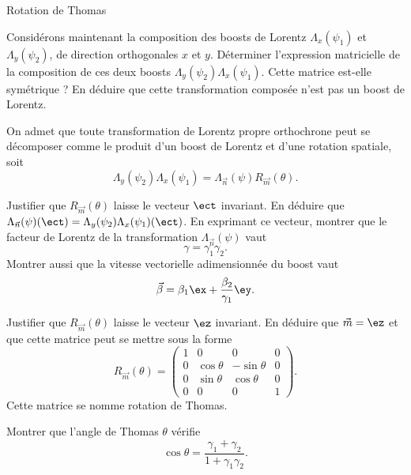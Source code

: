 \begin{exo}[PC][3][TD]{Rotation de Thomas}
\begin{quest}
      \item Considérons maintenant la composition des boosts de Lorentz $\Lambda_x(\psi_1)$ et $\Lambda_y(\psi_2)$, de direction orthogonales $x$ et $y$. Déterminer l'expression matricielle de la composition de ces deux boosts $\Lambda_y(\psi_2) \Lambda_x(\psi_1) $. Cette matrice est-elle symétrique ? En déduire que cette transformation composée n'est pas un boost de Lorentz. 
    \end{quest}
    On admet que toute transformation de Lorentz propre orthochrone peut se décomposer comme le produit d'un boost de Lorentz et d'une rotation spatiale, soit 
      \begin{equation}
        \Lambda_y(\psi_2) \Lambda_x(\psi_1)  = \Lambda_{\Vec{n}}(\psi) R_{\Vec{m}}(\theta).
      \end{equation}
      \begin{quest}
      \item 
      Justifier que $R_{\Vec{m}}(\theta)$ laisse le vecteur $\ect$ invariant.  En déduire que $\Lambda_{\Vec{n}}(\psi)(\ect) = \Lambda_y(\psi_2)\Lambda_x(\psi_1) (\ect)$. En exprimant ce vecteur, montrer que le facteur de Lorentz de la transformation $\Lambda_{\Vec{n}}(\psi)$ vaut 
      \begin{equation}
        \gamma = \gamma_1\gamma_2.
      \end{equation}
      Montrer aussi que la vitesse vectorielle adimensionnée  du boost vaut 
      \begin{equation}
        \Vec{\beta} = \beta_1 \ex + \frac{\beta_2}{\gamma_1} \ey.
      \end{equation}
      \item Justifier que $R_{\Vec{m}}(\theta)$ laisse le vecteur $\ez$ invariant. En déduire que $\Vec{m} = \ez$ et que cette matrice peut se mettre sous la forme 
      \begin{equation}
        R_{\Vec{m}}(\theta) = \begin{pmatrix}
          1 & 0 & 0 & 0 \\
          0 & \cos \theta & -\sin \theta & 0 \\
          0 & \sin \theta & \cos \theta & 0 \\
          0 & 0 & 0 & 1
        \end{pmatrix}.
      \end{equation}
      Cette matrice se nomme rotation de Thomas.
      \item Montrer que l'angle de Thomas $\theta$ vérifie 
      \begin{equation}
        \cos \theta = \frac{\gamma_1 + \gamma_2}{1 +\gamma_1\gamma_2}.
      \end{equation}
    \end{quest}
  \end{exo}


